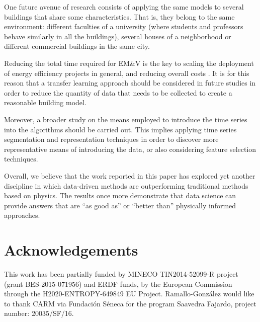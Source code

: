 \documentclass[10pt, conference, compsocconf]{IEEEtran}
\begin{document}
One future avenue of research consists of applying the same models to several buildings that share some characteristics. That is, they belong to the same environment: different faculties of a university (where students and professors behave similarly in all the buildings), several houses of a neighborhood or different commercial buildings in the same city.

Reducing the total time required for EM\&V is the key to scaling the deployment of energy efficiency projects in general, and reducing overall costs \cite{granderson2015automated}. It is for this reason that a transfer learning approach should be considered in future studies in order to reduce the quantity of data that needs to be collected to create a reasonable building model.

Moreover, a broader study on the means employed to introduce the time series into the algorithms should be carried out. This implies applying time series segmentation and representation techniques in order to discover more representative means of introducing the data, or also considering feature selection techniques.


Overall, we believe that the work reported in this paper has explored yet another discipline in which data-driven methods are outperforming traditional methods based on physics. The results once more demonstrate that data science can provide answers that are “as good as” or “better than” physically informed approaches.

\section*{Acknowledgements}

This work has been partially funded by MINECO TIN2014-52099-R project (grant BES-2015-071956) and ERDF funds, by the European Commission through the H2020-ENTROPY-649849 EU Project. Ramallo-González would like to thank CARM via Fundación Séneca for the program Saavedra Fajardo, project number: 20035/SF/16.


%
%
\end{document}
